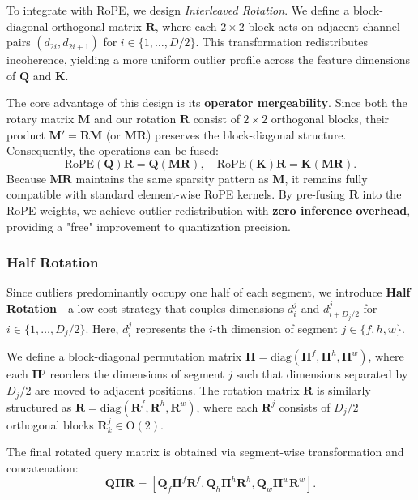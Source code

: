 To integrate with RoPE, we design \textit{Interleaved Rotation}. We define a block-diagonal orthogonal matrix $\mathbf{R}$, where each $2 \times 2$ block acts on adjacent channel pairs $(d_{2i}, d_{2i+1})$ for $i \in \{1, \dots, D/2\}$. This transformation redistributes incoherence, yielding a more uniform outlier profile across the feature dimensions of $\mathbf{Q}$ and $\mathbf{K}$.

The core advantage of this design is its \textbf{operator mergeability}. Since both the rotary matrix $\mathbf{M}$ and our rotation $\mathbf{R}$ consist of $2 \times 2$ orthogonal blocks, their product $\mathbf{M}' = \mathbf{R}\mathbf{M}$ (or $\mathbf{M}\mathbf{R}$) preserves the block-diagonal structure. Consequently, the operations can be fused:
\begin{equation}
    \text{RoPE}(\mathbf{Q})\mathbf{R} = \mathbf{Q}(\mathbf{M}\mathbf{R}), \quad \text{RoPE}(\mathbf{K})\mathbf{R} = \mathbf{K}(\mathbf{M}\mathbf{R}).
\end{equation}
Because $\mathbf{M}\mathbf{R}$ maintains the same sparsity pattern as $\mathbf{M}$, it remains fully compatible with standard element-wise RoPE kernels. By pre-fusing $\mathbf{R}$ into the RoPE weights, we achieve outlier redistribution with \textbf{zero inference overhead}, providing a "free" improvement to quantization precision.


\subsubsection{Half Rotation}
\label{sssec:half_rotation}

Since outliers predominantly occupy one half of each segment, we introduce \textbf{Half Rotation}---a low-cost strategy that couples dimensions $d^j_{i}$ and $d^j_{i+D_j/2}$ for $i \in \{1, \dots, D_j/2\}$. Here, $d^j_{i}$ represents the $i$-th dimension of segment $j \in \{f, h, w\}$.

We define a block-diagonal permutation matrix $\mathbf{\Pi} = \mathrm{diag}(\mathbf{\Pi}^f, \mathbf{\Pi}^h, \mathbf{\Pi}^w)$, where each $\mathbf{\Pi}^j$ reorders the dimensions of segment $j$ such that dimensions separated by $D_j/2$ are moved to adjacent positions. The rotation matrix $\mathbf{R}$ is similarly structured as $\mathbf{R} = \mathrm{diag}(\mathbf{R}^f, \mathbf{R}^h, \mathbf{R}^w)$, where each $\mathbf{R}^j$ consists of $D_j/2$ orthogonal blocks $\mathbf{R}^j_k \in \mathrm{O}(2)$.

The final rotated query matrix is obtained via segment-wise transformation and concatenation:
\begin{equation}
    \mathbf{Q}\mathbf{\Pi}\mathbf{R} = \left[ \mathbf{Q}_f \mathbf{\Pi}^f \mathbf{R}^f, \mathbf{Q}_h \mathbf{\Pi}^h \mathbf{R}^h, \mathbf{Q}_w \mathbf{\Pi}^w \mathbf{R}^w \right].
\end{equation}

